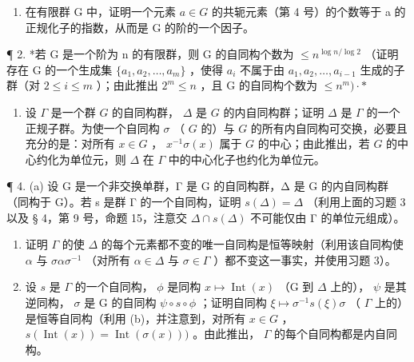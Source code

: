 \BourbakiExercisesSection

\begin{enumerate}
\def\labelenumi{\arabic{enumi}.}
\tightlist
\item
  在有限群 G 中，证明一个元素 \(a \in G\) 的共轭元素（第 4 号）的个数等于 a 的正规化子的指数，从而是 G 的阶的一个因子。
\end{enumerate}

¶ 2. *若 G 是一个阶为 n 的有限群，则 G 的自同构个数为 \(\leqslant n^{\log n/\log 2}\) （证明存在 G 的一个生成集 \(\{a_{1}, a_{2}, \ldots, a_{m}\}\) ，使得 \(a_{i}\) 不属于由 \(a_{1}, a_{2}, \ldots, a_{i-1}\) 生成的子群（对 \(2 \leqslant i \leqslant m\) ）；由此推出 \(2^{m} \leqslant n\) ，且 G 的自同构个数为 \(\leqslant n^{m})\cdot*\)

\begin{enumerate}
\def\labelenumi{\arabic{enumi}.}
\setcounter{enumi}{2}
\tightlist
\item
  设 \(\Gamma\) 是一个群 \(G\) 的自同构群， \(\Delta\) 是 \(G\) 的内自同构群；证明 \(\Delta\) 是 \(\Gamma\) 的一个正规子群。为使一个自同构 \(\sigma\) （ \(G\) 的）与 \(G\) 的所有内自同构可交换，必要且充分的是：对所有 \(x \in G\) ， \(x^{-1}\sigma(x)\) 属于 \(G\) 的中心；由此推出，若 \(G\) 的中心约化为单位元，则 \(\Delta\) 在 \(\Gamma\) 中的中心化子也约化为单位元。
\end{enumerate}

¶ 4. (a) 设 G 是一个非交换单群，Γ 是 G 的自同构群，Δ 是 G 的内自同构群（同构于 G）。若 s 是群 Γ 的一个自同构，证明 \(s(\Delta) = \Delta\) （利用上面的习题 3 以及 § 4，第 9 号，命题 15，注意交 \(\Delta \cap s(\Delta)\) 不可能仅由 Γ 的单位元组成）。

\begin{enumerate}
\def\labelenumi{(\alph{enumi})}
\setcounter{enumi}{1}
\item
  证明 \(\Gamma\) 的使 \(\Delta\) 的每个元素都不变的唯一自同构是恒等映射（利用该自同构使 \(\alpha\) 与 \(\sigma \alpha \sigma^{-1}\) （对所有 \(\alpha \in \Delta\) 与 \(\sigma \in \Gamma\) ）都不变这一事实，并使用习题 3）。
\item
  设 \(s\) 是 \(\Gamma\) 的一个自同构， \(\phi\) 是同构 \(x \mapsto \operatorname{Int}(x)\) （G 到 \(\Delta\) 上的）， \(\psi\) 是其逆同构， \(\sigma\) 是 G 的自同构 \(\psi \circ s \circ \phi\) ；证明自同构 \(\xi \mapsto \sigma^{-1}s(\xi)\sigma\) （ \(\Gamma\) 上的）是恒等自同构（利用 (b)，并注意到，对所有 \(x \in G\) ， \(s(\operatorname{Int}(x)) = \operatorname{Int}(\sigma(x)))\) 。由此推出， \(\Gamma\) 的每个自同构都是内自同构。
\end{enumerate}


